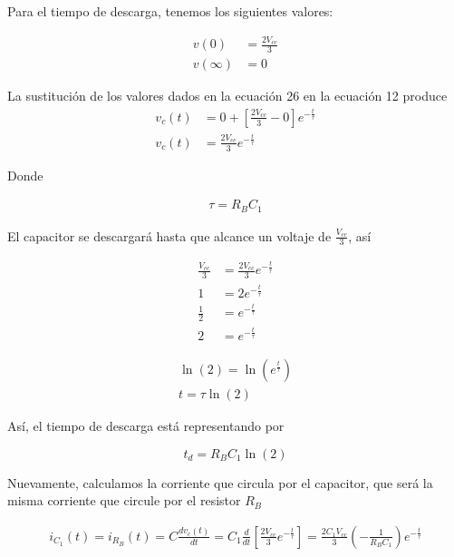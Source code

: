 \documentclass{article}
\begin{document}
Para el tiempo de descarga, tenemos los siguientes valores:

\begin{subequations}
	\begin{align}
		v(0) &= \frac{2V_{cc}}{3} \label{second:a} \\
		v(\infty) &= 0 \label{second:b}
	\end{align}
\end{subequations}

La sustitución de los valores dados en la ecuación 26 en la ecuación 12 produce
\begin{align}
	v_c(t) &= 0 + \left[ \frac{2V_{cc}}{3} - 0 \right] e^{-\frac{t}{\tau}} \nonumber \\
	v_c(t) &= \frac{2V_{cc}}{3} e^{-\frac{t}{\tau}}
\end{align}

Donde

\begin{align}
	\tau = R_BC_1
\end{align}

El capacitor se descargará hasta que alcance un voltaje de $\frac{V_{cc}}{3}$, así

\begin{align}
	\frac{V_{cc}}{3} &= \frac{2V_{cc}}{3} e^{-\frac{t}{\tau}} \nonumber \\
	1 &= 2 e^{-\frac{t}{\tau}} \nonumber \\
	\frac{1}{2} &= e^{-\frac{t}{\tau}} \nonumber \\
	2 &= e^{-\frac{t}{\tau}}
\end{align}

\begin{align}
	\ln (2) = \ln \left( e^{\frac{t}{\tau}} \right) \nonumber \\
	t = \tau \ln (2) \nonumber
\end{align}

Así, el tiempo de descarga está representando por


\begin{tcolorbox}[colback=red!5!white,colframe=red!75!black,arc=0mm,boxrule=0mm,width=(\linewidth+0.5cm)]
	\begin{equation}
		t_d = R_BC_1 \ln (2)
	\end{equation}
\end{tcolorbox}

Nuevamente, calculamos la corriente que circula por el capacitor, que será la misma corriente que circule por el resistor $R_B$

\begin{align}
	i_{C_1}(t) = i_{R_B}(t) = C \frac{dv_c(t)}{dt}  = C_1 \frac{d}{dt} \left[ \frac{2V_{cc}}{3} e^{-\frac{t}{\tau}} \right] = \frac{2C_1V_{cc}}{3} \left( -\frac{1}{R_BC_1} \right) e^{-\frac{t}{\tau}} \nonumber
\end{align}
\end{document}
